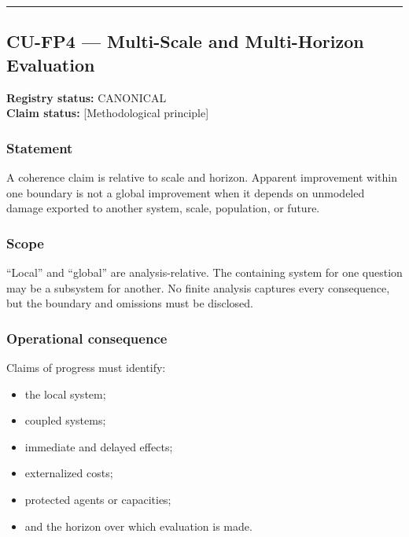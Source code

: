 \documentclass[
  11pt,
]{article}
\providecommand{\tightlist}{%
  \setlength{\itemsep}{0pt}\setlength{\parskip}{0pt}}
\begin{document}
\begin{center}\rule{0.5\linewidth}{0.5pt}\end{center}

\subsection{CU-FP4 --- Multi-Scale and Multi-Horizon
Evaluation}\label{cu-fp4-multi-scale-and-multi-horizon-evaluation}

\textbf{Registry status:} CANONICAL\\
\textbf{Claim status:} {[}Methodological principle{]}

\subsubsection{Statement}\label{statement-3}

A coherence claim is relative to scale and horizon. Apparent improvement
within one boundary is not a global improvement when it depends on
unmodeled damage exported to another system, scale, population, or
future.

\subsubsection{Scope}\label{scope-3}

``Local'' and ``global'' are analysis-relative. The containing system
for one question may be a subsystem for another. No finite analysis
captures every consequence, but the boundary and omissions must be
disclosed.

\subsubsection{Operational consequence}\label{operational-consequence-3}

Claims of progress must identify:

\begin{itemize}
\tightlist
\item
  the local system;
\item
  coupled systems;
\item
  immediate and delayed effects;
\item
  externalized costs;
\item
  protected agents or capacities;
\item
  and the horizon over which evaluation is made.
\end{itemize}
\end{document}

